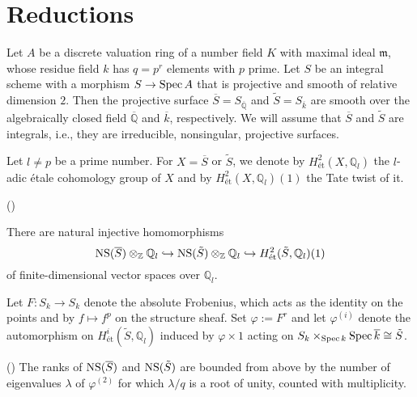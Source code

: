 \documentclass[main]{subfiles}
\begin{document}
\chapter{Reductions}
\label{chap:reduction}

Let $A$ be a discrete valuation ring of a number field $K$ with maximal ideal $\mathfrak{m}$, whose residue field $k$ has $q=p^r$ elements with $p$ prime.
Let $S$ be an integral scheme with a morphism $S \to \operatorname{Spec} A$ that is projective and smooth of relative dimension $2$.
Then the projective surface $\overline{S}=S_{\overline{\mathbb{Q}}}$ and $\tilde{S}=S_{\overline{k}}$ are smooth over the algebraically closed field $\overline{\mathbb{Q}}$ and $\overline{k}$, respectively.
We will assume that $\overline{S}$ and $\tilde{S}$ are integrals, i.e., they are irreducible, nonsingular, projective surfaces.

Let $l \neq p$ be a prime number. For $X=\overline{S}$ or $\tilde{S}$, we denote by $H_{\text{\'et}}^{2}(X, \mathbb{Q}_l)$ the $l$-adic \'etale cohomology group of $X$ and by $H_{\text{\'et}}^{2}(X, \mathbb{Q}_l)(1)$ the Tate twist of it.

\begin{thm}{(\cite[Proposition 6.2.]{ref:vanluijk2007})}

    There are natural injective homomorphisms
    \begin{equation}
        \operatorname{NS} (\overline{S}) \otimes_{\mathbb{Z}} \mathbb{Q}_{l} \hookrightarrow \operatorname{NS} (\tilde{S}) \otimes_{\mathbb{Z}} \mathbb{Q}_{l} \hookrightarrow H_{\text{\'et}}^{2}(\tilde{S}, \mathbb{Q}_{l})(1)
    \end{equation}
    of finite-dimensional vector spaces over $\mathbb{Q}_l$.
\end{thm}

Let $F: S_k \to S_k$ denote the absolute Frobenius, which acts as the identity on the points and by $f \mapsto f^p$ on the structure sheaf.
Set $\varphi:=F^{r}$ and let $\varphi^{(i)}$ denote the automorphism on $H_{\text{\'et}}^{i}(\tilde{S}, \mathbb{Q}_l)$ induced by $\varphi \times 1$ acting on $S_k \times_{\operatorname{Spec} k} \operatorname{Spec} \overline{k} \cong \tilde{S}$.

\begin{cor}{(\cite[Corollary 6.4.]{ref:vanluijk2007})}
    \label{cor:ns_upper_bound}
    The ranks of $\operatorname{NS} (\overline{S})$ and $\operatorname{NS} (\tilde{S})$ are bounded from above by the number of eigenvalues $\lambda$ of $\varphi^{(2)}$ for which $\lambda/q$ is a root of unity, counted with multiplicity.
\end{cor}
\end{document}
